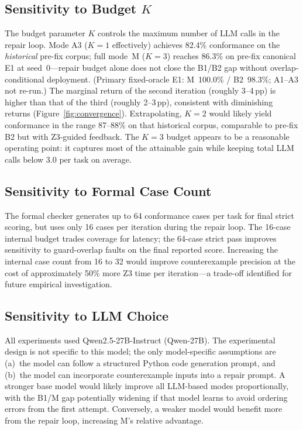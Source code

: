 \subsection{Sensitivity to Budget $K$}

The budget parameter $K$ controls the maximum number of LLM calls in the repair
loop.
Mode A3 ($K=1$ effectively) achieves 82.4\% conformance on the
\emph{historical} pre-fix corpus; full mode~M ($K=3$) reaches 86.3\% on
pre-fix canonical E1 at seed~0---repair budget alone does not close the
B1/B2 gap without overlap-conditional deployment.
(Primary fixed-oracle E1: M~100.0\% / B2~98.3\%; A1--A3 not re-run.)
The marginal return of the second iteration (roughly 3--4\,pp) is higher than that of
the third (roughly 2--3\,pp), consistent with diminishing returns
(Figure~\ref{fig:convergence}).
Extrapolating, $K=2$ would likely yield conformance in the range 87--88\% on that
historical corpus, comparable to pre-fix B2 but with Z3-guided feedback.
The $K=3$ budget appears to be a reasonable operating point: it captures most of the
attainable gain while keeping total LLM calls below 3.0 per task on average.

\subsection{Sensitivity to Formal Case Count}

The formal checker generates up to 64 conformance cases per task for final strict
scoring, but uses only 16 cases per iteration during the repair loop.
The 16-case internal budget trades coverage for latency; the 64-case strict pass
improves sensitivity to guard-overlap faults on the final reported score.
Increasing the internal case count from 16 to 32 would improve counterexample precision
at the cost of approximately 50\% more Z3 time per iteration---a trade-off identified
for future empirical investigation.

\subsection{Sensitivity to LLM Choice}

All experiments used Qwen2.5-27B-Instruct (\textsf{Qwen-27B}).
The experimental design is not specific to this model; the only model-specific
assumptions are (a)~the model can follow a structured Python code generation prompt,
and (b)~the model can incorporate counterexample inputs into a repair prompt.
A stronger base model would likely improve all LLM-based modes
proportionally, with the B1/M gap potentially widening if that model learns to
avoid ordering errors from the first attempt.
Conversely, a weaker model would benefit more from the repair loop, increasing M's
relative advantage.

